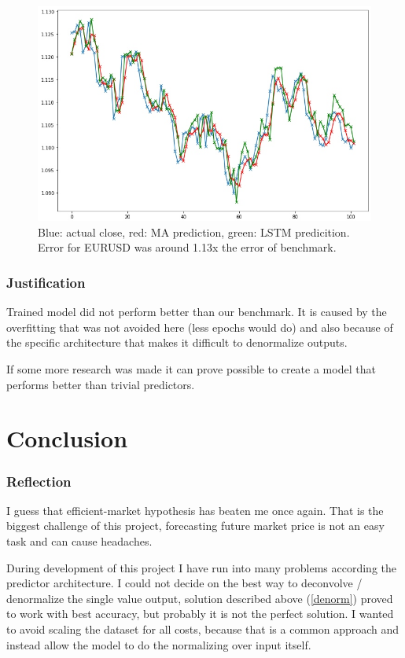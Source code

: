\documentclass[a4paper,12pt]{article}
\begin{document}
\begin{figure}[h]
	\centering
	\includegraphics[scale=2.1]{eurusdVs}
	\caption{Blue: actual close, red: MA prediction, green: LSTM predicition. Error for EURUSD was around 1.13x the error of benchmark.}
\end{figure}

\section{Justification}
Trained model did not perform better than our benchmark. It is caused by the overfitting that was not avoided here (less epochs would do) and also because of the specific architecture that makes it difficult to denormalize outputs.

If some more research was made it can prove possible to create a model that performs better than trivial predictors.


\part{Conclusion}
\section{Reflection}
I guess that efficient-market hypothesis has beaten me once again. That is the biggest challenge of this project, forecasting future market price is not an easy task and can cause headaches.

During development of this project I have run into many problems according the predictor architecture. I could not decide on the best way to deconvolve / denormalize the single value output, solution described above (\ref{denorm}) proved to work with best accuracy, but probably it is not the perfect solution. I wanted to avoid scaling the dataset for all costs, because that is a common approach and instead allow the model to do the normalizing over input itself.
\end{document}
